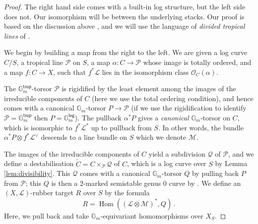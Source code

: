 \documentclass[a4paper,12pt]{article} %
\newcommand{\MWvone}[1]{}%
\newcommand{\MWref}[1]{#1}
\newcommand{\on}[1]{\operatorname{#1}}
\newcommand{\bb}[1]{{\mathbb{#1}}}
\newcommand{\ca}[1]{{\mathcal{#1}}}
\theoremstyle{definition}
\theoremstyle{plain}%
\begin{document}
\begin{proof}
The right hand side comes with a built-in log structure, but the left side
does not. Our isomorphism will be between the underlying stacks. Our proof is based on the discussion above \cite[\MWref{Proposition 5.5.2}\MWvone{Proposition 5.14}]{Marcus2017Logarithmic-com}, and we will use the language of \emph{divided tropical lines} of \cite{Marcus2017Logarithmic-com}.

We begin by building a map from the right to the left. We are given a log curve $C/S$, a tropical line $\ca P$ on $S$, a map $\alpha\colon C\to \ca P$ whose image is totally ordered, and a map $f\colon C \to X$, such that $f^*\ca L$ lies in the isomorphism class $\ca O_C(\alpha)$. 

The $\bb G_m^{\mathsf{trop}}$-torsor $\ca P$ is rigidified by the least element among the images of the irreducible components of $C$ (here we use the total ordering condition), and hence comes with a canonical $\bb G_m$-torsor $P \to \ca P$ (if we use the rigidification to identify $\ca P = \bb G_m^{\mathsf{trop}}$ then $P = \bb G_m^{\mathsf{log}}$). The pullback $\alpha^*P$ gives a \emph{canonical} $\bb G_m$-torsor on $C$, which is isomorphic to $f^*\ca L^*$ up to pullback from $S$. In other words, the bundle $\alpha^*P \otimes f^*\ca L^\vee$ descends to a line bundle on $S$ which we denote $\ca M$. 

The images of the irreducible components of $C$ yield a subdivision $\ca Q$ of $\ca P$, and we define a destabilisation $\tilde C = C \times_{\ca P}\ca Q$ of $C$, which is a log curve over $S$ by Lemma \ref{lem:divisibility}. This $\ca Q$ comes with a canonical $\bb G_m$-torsor $Q$ by pulling back $P$ from $\ca P$; this $Q$ is then a 2-marked semistable genus 0 curve by \cite[\MWref{Proposition 5.2.4}\MWvone{Proposition 5.7}]{Marcus2017Logarithmic-com}. We define an $(X, \ca L)$-rubber target $R$ over $S$ by the formula
$$ R = \on{Hom}((\ca L \otimes \ca M)^*, Q)\,. $$
Here, we pull back %
and take $\bb G_m$-equivariant homomorphisms over $X_S$. 



\end{proof}
\end{document}
